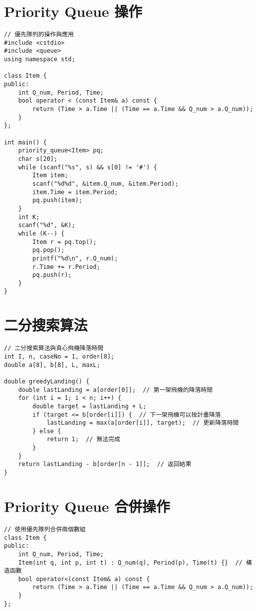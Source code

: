 \documentclass{article}
\begin{document}
\begin{multicols}{2}
\section{Priority Queue 操作}

\begin{lstlisting}
// 優先隊列的操作與應用
#include <cstdio>
#include <queue>
using namespace std;

class Item {     
public:
    int Q_num, Period, Time;
    bool operator < (const Item& a) const {
        return (Time > a.Time || (Time == a.Time && Q_num > a.Q_num));
    }
};

int main() {       
    priority_queue<Item> pq;
    char s[20];
    while (scanf("%s", s) && s[0] != '#') {
        Item item;
        scanf("%d%d", &item.Q_num, &item.Period);
        item.Time = item.Period;
        pq.push(item);
    }
    int K;
    scanf("%d", &K);
    while (K--) {
        Item r = pq.top();
        pq.pop();
        printf("%d\n", r.Q_num);
        r.Time += r.Period;
        pq.push(r);
    }
}
\end{lstlisting}

\section{二分搜索算法}

\begin{lstlisting}
// 二分搜索算法與貪心飛機降落時間
int I, n, caseNo = 1, order[8]; 
double a[8], b[8], L, maxL;

double greedyLanding() {
    double lastLanding = a[order[0]];  // 第一架飛機的降落時間
    for (int i = 1; i < n; i++) {
        double target = lastLanding + L;
        if (target <= b[order[i]]) {  // 下一架飛機可以按計畫降落
            lastLanding = max(a[order[i]], target);  // 更新降落時間
        } else {
            return 1;  // 無法完成
        }
    }
    return lastLanding - b[order[n - 1]];  // 返回結果
}
\end{lstlisting}

\section{Priority Queue 合併操作}

\begin{lstlisting}
// 使用優先隊列合併兩個數組
class Item {
public:
    int Q_num, Period, Time;
    Item(int q, int p, int t) : Q_num(q), Period(p), Time(t) {}  // 構造函數
    bool operator<(const Item& a) const {
        return (Time > a.Time || (Time == a.Time && Q_num > a.Q_num));
    }
};


\end{lstlisting}
\end{multicols}
\end{document}
